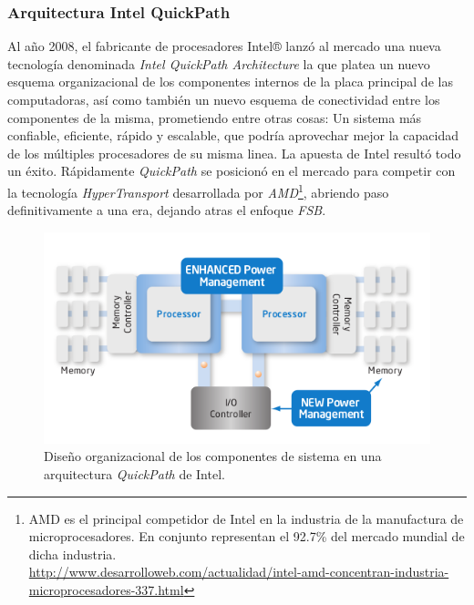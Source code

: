 \subsubsection{Arquitectura Intel QuickPath}
Al año 2008, el fabricante de procesadores Intel® lanzó al mercado una nueva tecnología denominada \emph{Intel QuickPath Architecture} \cite{paper:quickpath} la que platea un nuevo esquema organizacional de los componentes internos de la placa principal de las computadoras, así como también un nuevo esquema de conectividad entre los componentes de la misma, prometiendo entre otras cosas: Un sistema más confiable, eficiente, rápido y escalable, que podría aprovechar mejor la capacidad de los múltiples procesadores de su misma linea. La apuesta de Intel resultó todo un éxito. Rápidamente \emph{QuickPath} se posicionó en el mercado para competir con la tecnología \emph{HyperTransport} desarrollada por \emph{AMD}\footnote{AMD es el principal competidor de Intel en la industria de la manufactura de microprocesadores. En conjunto representan el 92.7\% del mercado mundial de dicha industria.\\ \url{http://www.desarrolloweb.com/actualidad/intel-amd-concentran-industria-microprocesadores-337.html}}, abriendo paso definitivamente a una era, dejando atras el enfoque \emph{FSB}.

\begin{figure}[!h]
	\centering
	\includegraphics[scale=.6]{imagenes/quickpath.png}
	\caption{Diseño organizacional de los componentes de sistema en una arquitectura \emph{QuickPath} de Intel.}
	\label{fig:quickpath}
\end{figure}

